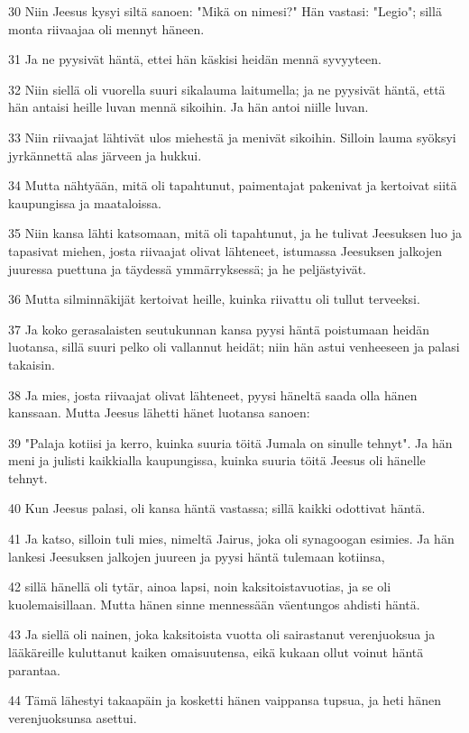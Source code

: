 \par 30 Niin Jeesus kysyi siltä sanoen: "Mikä on nimesi?" Hän vastasi: "Legio"; sillä monta riivaajaa oli mennyt häneen.
\par 31 Ja ne pyysivät häntä, ettei hän käskisi heidän mennä syvyyteen.
\par 32 Niin siellä oli vuorella suuri sikalauma laitumella; ja ne pyysivät häntä, että hän antaisi heille luvan mennä sikoihin. Ja hän antoi niille luvan.
\par 33 Niin riivaajat lähtivät ulos miehestä ja menivät sikoihin. Silloin lauma syöksyi jyrkännettä alas järveen ja hukkui.
\par 34 Mutta nähtyään, mitä oli tapahtunut, paimentajat pakenivat ja kertoivat siitä kaupungissa ja maataloissa.
\par 35 Niin kansa lähti katsomaan, mitä oli tapahtunut, ja he tulivat Jeesuksen luo ja tapasivat miehen, josta riivaajat olivat lähteneet, istumassa Jeesuksen jalkojen juuressa puettuna ja täydessä ymmärryksessä; ja he peljästyivät.
\par 36 Mutta silminnäkijät kertoivat heille, kuinka riivattu oli tullut terveeksi.
\par 37 Ja koko gerasalaisten seutukunnan kansa pyysi häntä poistumaan heidän luotansa, sillä suuri pelko oli vallannut heidät; niin hän astui venheeseen ja palasi takaisin.
\par 38 Ja mies, josta riivaajat olivat lähteneet, pyysi häneltä saada olla hänen kanssaan. Mutta Jeesus lähetti hänet luotansa sanoen:
\par 39 "Palaja kotiisi ja kerro, kuinka suuria töitä Jumala on sinulle tehnyt". Ja hän meni ja julisti kaikkialla kaupungissa, kuinka suuria töitä Jeesus oli hänelle tehnyt.
\par 40 Kun Jeesus palasi, oli kansa häntä vastassa; sillä kaikki odottivat häntä.
\par 41 Ja katso, silloin tuli mies, nimeltä Jairus, joka oli synagoogan esimies. Ja hän lankesi Jeesuksen jalkojen juureen ja pyysi häntä tulemaan kotiinsa,
\par 42 sillä hänellä oli tytär, ainoa lapsi, noin kaksitoistavuotias, ja se oli kuolemaisillaan. Mutta hänen sinne mennessään väentungos ahdisti häntä.
\par 43 Ja siellä oli nainen, joka kaksitoista vuotta oli sairastanut verenjuoksua ja lääkäreille kuluttanut kaiken omaisuutensa, eikä kukaan ollut voinut häntä parantaa.
\par 44 Tämä lähestyi takaapäin ja kosketti hänen vaippansa tupsua, ja heti hänen verenjuoksunsa asettui.
